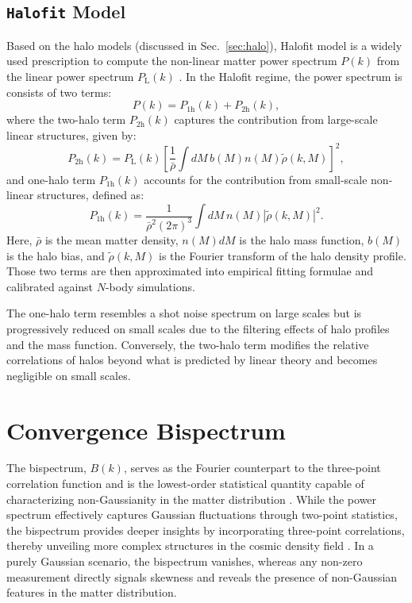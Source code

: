 \subsection{\texttt{Halofit} Model}
Based on the halo models (discussed in Sec.~\ref{sec:halo}), Halofit model is a widely used prescription to compute the non-linear matter power spectrum \( P(k) \) from the linear power spectrum \( P_{\mathrm{L}}(k) \) \citep{2003MNRAS.341.1311S, 2012ApJ...761..152T}. In the Halofit regime, the power spectrum is consists of two terms:
\begin{equation}
    P(k) = P_{\mathrm{1h}}(k) + P_{\mathrm{2h}}(k),
    \label{eq:halofit_model}
\end{equation}
where the two-halo term \( P_{\mathrm{2h}}(k) \) captures the contribution from large-scale linear structures, given by:   
\begin{equation}
    P_{\mathrm{2h}}(k) = P_{\mathrm{L}}(k) \left[ \frac{1}{\bar{\rho}} \int dM \, b(M) n(M) \tilde{\rho}(k, M) \right]^2,
    \label{eq:halofit_1h}
\end{equation}
and one-halo term $P_{\mathrm{1h}}(k)$ accounts for the contribution from small-scale non-linear structures, defined as:
\begin{equation}
    P_{\mathrm{1h}}(k) = \frac{1}{\bar{\rho}^2 (2\pi)^3} \int dM \, n(M) \left| \tilde{\rho}(k, M) \right|^2.
    \label{eq:halofit_2h}
\end{equation}
Here, \( \bar{\rho} \) is the mean matter density, \( n(M) dM \) is the halo mass function, \( b(M) \) is the halo bias, and \( \tilde{\rho}(k, M) \) is the Fourier transform of the halo density profile. 
Those two terms are then approximated into empirical fitting formulae and calibrated against \( N \)-body simulations.

The one-halo term resembles a shot noise spectrum on large scales but is progressively reduced on small scales due to the filtering effects of halo profiles and the mass function. Conversely, the two-halo term modifies the relative correlations of halos beyond what is predicted by linear theory and becomes negligible on small scales. 

\section{Convergence Bispectrum}
The bispectrum, \( B(k) \), serves as the Fourier counterpart to the three-point correlation function and is the lowest-order statistical quantity capable of characterizing non-Gaussianity in the matter distribution \citep{2002PhR...367....1B}. While the power spectrum effectively captures Gaussian fluctuations through two-point statistics, the bispectrum provides deeper insights by incorporating three-point correlations, thereby unveiling more complex structures in the cosmic density field \citep{1999ApJ...517..531S, 2004MNRAS.348..897T}. In a purely Gaussian scenario, the bispectrum vanishes, whereas any non-zero measurement directly signals skewness and reveals the presence of non-Gaussian features in the matter distribution.

